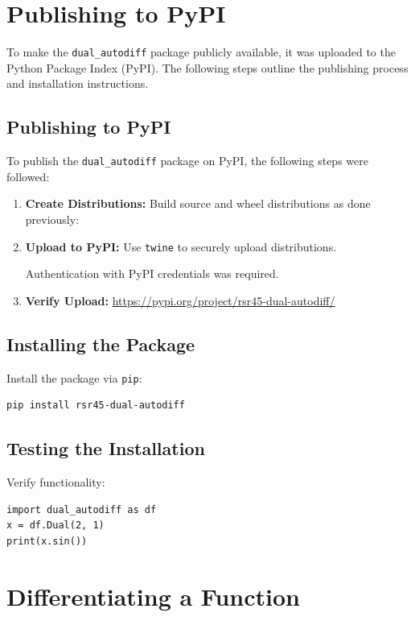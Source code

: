 \documentclass[a4paper,12pt]{article}
\begin{document}
\section{Publishing to PyPI}

To make the \texttt{dual\_autodiff} package publicly available, it was uploaded to the Python Package Index (PyPI). The following steps outline the publishing process and installation instructions.

\subsection{Publishing to PyPI}

To publish the \texttt{dual\_autodiff} package on PyPI, the following steps were followed:

\begin{enumerate}
    \item \textbf{Create Distributions:}
    Build source and wheel distributions as done previously:

    \item \textbf{Upload to PyPI:}
    Use \texttt{twine} to securely upload distributions.
    
    Authentication with PyPI credentials was required.

    \item \textbf{Verify Upload:}
    \url{https://pypi.org/project/rsr45-dual-autodiff/}
\end{enumerate}

\subsection{Installing the Package}
Install the package via \texttt{pip}:
\begin{verbatim}
pip install rsr45-dual-autodiff
\end{verbatim}

\subsection{Testing the Installation}
Verify functionality:
\begin{verbatim}
import dual_autodiff as df
x = df.Dual(2, 1)
print(x.sin())
\end{verbatim}



\section{Differentiating a Function}
\end{document}
